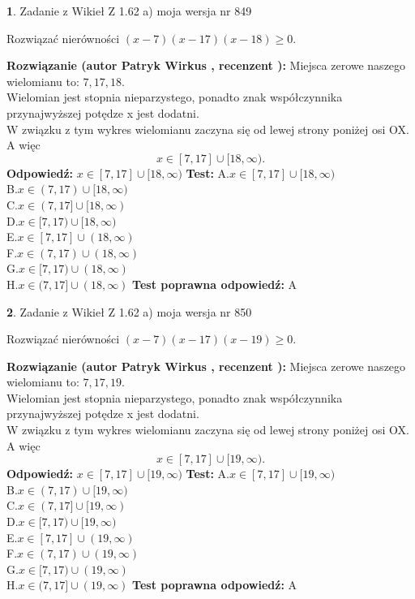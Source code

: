 \documentclass[12pt, a4paper]{article}
\theoremstyle{definition} %
\newtheorem{zad}{}
\newcommand{\zadStart}[1]{\begin{zad}#1\newline}
\newcommand{\zadStop}{\end{zad}}
\newcommand{\rozwStart}[2]{\noindent \textbf{Rozwiązanie (autor #1 , recenzent #2): }\newline}
\newcommand{\rozwStop}{\newline}
\newcommand{\odpStart}{\noindent \textbf{Odpowiedź:}\newline}
\newcommand{\odpStop}{\newline}
\newcommand{\testStart}{\noindent \textbf{Test:}\newline}
\newcommand{\testStop}{\newline}
\newcommand{\kluczStart}{\noindent \textbf{Test poprawna odpowiedź:}\newline}
\newcommand{\kluczStop}{\newline}
\begin{document}
\zadStart{Zadanie z Wikieł Z 1.62 a) moja wersja nr 849}

Rozwiązać nierówności $(x-7)(x-17)(x-18)\ge0$.
\zadStop
\rozwStart{Patryk Wirkus}{}
Miejsca zerowe naszego wielomianu to: $7, 17, 18$.\\
Wielomian jest stopnia nieparzystego, ponadto znak współczynnika przy\linebreak najwyższej potędze x jest dodatni.\\ W związku z tym wykres wielomianu zaczyna się od lewej strony poniżej osi OX. A więc $$x \in [7,17] \cup [18,\infty).$$
\rozwStop
\odpStart
$x \in [7,17] \cup [18,\infty)$
\odpStop
\testStart
A.$x \in [7,17] \cup [18,\infty)$\\
B.$x \in (7,17) \cup [18,\infty)$\\
C.$x \in (7,17] \cup [18,\infty)$\\
D.$x \in [7,17) \cup [18,\infty)$\\
E.$x \in [7,17] \cup (18,\infty)$\\
F.$x \in (7,17) \cup (18,\infty)$\\
G.$x \in [7,17) \cup (18,\infty)$\\
H.$x \in (7,17] \cup (18,\infty)$
\testStop
\kluczStart
A
\kluczStop



\zadStart{Zadanie z Wikieł Z 1.62 a) moja wersja nr 850}

Rozwiązać nierówności $(x-7)(x-17)(x-19)\ge0$.
\zadStop
\rozwStart{Patryk Wirkus}{}
Miejsca zerowe naszego wielomianu to: $7, 17, 19$.\\
Wielomian jest stopnia nieparzystego, ponadto znak współczynnika przy\linebreak najwyższej potędze x jest dodatni.\\ W związku z tym wykres wielomianu zaczyna się od lewej strony poniżej osi OX. A więc $$x \in [7,17] \cup [19,\infty).$$
\rozwStop
\odpStart
$x \in [7,17] \cup [19,\infty)$
\odpStop
\testStart
A.$x \in [7,17] \cup [19,\infty)$\\
B.$x \in (7,17) \cup [19,\infty)$\\
C.$x \in (7,17] \cup [19,\infty)$\\
D.$x \in [7,17) \cup [19,\infty)$\\
E.$x \in [7,17] \cup (19,\infty)$\\
F.$x \in (7,17) \cup (19,\infty)$\\
G.$x \in [7,17) \cup (19,\infty)$\\
H.$x \in (7,17] \cup (19,\infty)$
\testStop
\kluczStart
A
\kluczStop
\end{document}
